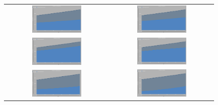 \documentclass[runningheads]{llncs}
\begin{document}
\begin{figure}[ht!]
\centering

\begin{tabular}{cc} %
  \includegraphics[width=0.5\textwidth]{./imgs/schizo.png} &  %
  \includegraphics[width=0.5\textwidth]{./imgs/bipolar.png} \\  %
  \includegraphics[width=0.5\textwidth]{./imgs/anxiety.png} &  %
  \includegraphics[width=0.5\textwidth]{./imgs/depress.png} \\  %
  \includegraphics[width=0.5\textwidth]{./imgs/Eating disorders.png} &  %
  \includegraphics[width=0.5\textwidth]{./imgs/obes.png} \\  %
\end{tabular}


\end{figure}
\end{document}
